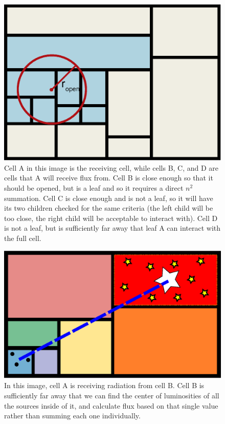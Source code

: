 \begin{figure}
\includegraphics[width=\textwidth]{graphics/opening_angles.eps}
\caption[The opening angle criteria.]{Cell A in this image is the receiving cell, while cells B, C, and D are cells that A will receive flux from. Cell B is close enough so that it should be opened, but is a leaf and so it requires a direct $n^2$ summation. Cell C is close enough and is not a leaf, so it will have its two children checked for the same criteria (the left child will be too close, the right child will be acceptable to interact with). Cell D is not a leaf, but is sufficiently far away that leaf A can interact with the full cell.}
\label{fig:openinganglecriteria}
\end{figure}

\begin{figure}
\includegraphics[width=\textwidth]{graphics/flux.eps}
\caption[The exchange of radiation.]{In this image, cell A is receiving radiation from cell B. Cell B is sufficiently far away that we can find the center of luminosities of all the sources inside of it, and calculate flux based on that single value rather than summing each one individually.}
\label{fig:radexchange}
\end{figure}


